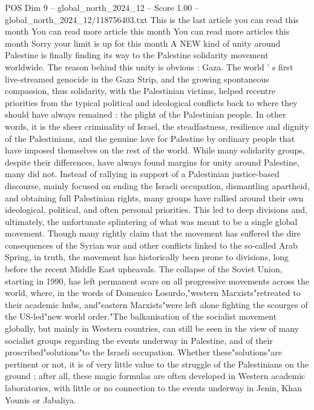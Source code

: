 \begin{textsample}{POS Dim 9 – global\_north\_2024\_12 – Score 1.00 – global\_north\_2024\_12/118756403.txt}  \label{ex:f9_pos_331}
This is the last article you can read this month You can read more article this month You can read more articles this month Sorry your limit is up for this month A NEW kind of unity around Palestine is finally finding its way to the Palestine solidarity movement worldwide.
The reason behind this unity is obvious : Gaza.
The world ' s first live-streamed genocide in the Gaza Strip, and the growing spontaneous compassion, thus solidarity, with the Palestinian victims, helped recentre priorities from the typical political and ideological conflicts back to where they should have always remained : the plight of the Palestinian people.
In other words, it is the sheer criminality of Israel, the steadfastness, resilience and dignity of the Palestinians, and the genuine love for Palestine by ordinary people that have imposed themselves on the rest of the world.
While many solidarity groups, despite their differences, have always found margins for unity around Palestine, many did not.
Instead of rallying in support of a Palestinian justice-based discourse, mainly focused on ending the Israeli occupation, dismantling apartheid, and obtaining full Palestinian rights, many groups have rallied around their own ideological, political, and often personal priorities.
This led to deep divisions and, ultimately, the unfortunate splintering of what was meant to be a single global movement.
Though many rightly claim that the movement has suffered the dire consequences of the Syrian war and other conflicts linked to the so-called Arab Spring, in truth, the movement has historically been prone to divisions, long before the recent Middle East upheavals.
The collapse of the Soviet Union, starting in 1990, has left permanent scars on all progressive movements across the world, where, in the words of Domenico Losurdo,"western Marxists"retreated to their academic hubs, and"eastern Marxists"were left alone fighting the scourges of the US-led"new world order."The balkanisation of the socialist movement globally, but mainly in Western countries, can still be seen in the view of many socialist groups regarding the events underway in Palestine, and of their proscribed"solutions"to the Israeli occupation.
Whether these"solutions"are pertinent or not, it is of very little value to the struggle of the Palestinians on the ground ; after all, these magic formulas are often developed in Western academic laboratories, with little or no connection to the events underway in Jenin, Khan Younis or Jabaliya.

\end{textsample}
